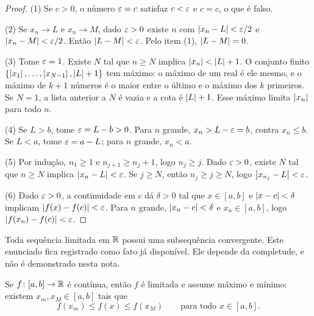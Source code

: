 \documentclass[11pt,a4paper]{article}
\begin{document}
\begin{proof}
(1) Se $c>0$, o n\'umero $\varepsilon=c$ satisfaz $c<\varepsilon$ e $c=c$, o que \'e falso.

(2) Se $x_n\to L$ e $x_n\to M$, dado $\varepsilon>0$ existe $n$ com $\left\lvert x_n-L \right\rvert<\varepsilon/2$ e $\left\lvert x_n-M \right\rvert<\varepsilon/2$. Ent\~ao $\left\lvert L-M \right\rvert<\varepsilon$. Pelo item (1), $\left\lvert L-M \right\rvert=0$.

(3) Tome $\varepsilon=1$. Existe $N$ tal que $n\ge N$ implica $\left\lvert x_n \right\rvert<\left\lvert L \right\rvert+1$. O conjunto finito $\{\left\lvert x_1 \right\rvert,\ldots,\left\lvert x_{N-1} \right\rvert,\left\lvert L \right\rvert+1\}$ tem m\'aximo: o m\'aximo de um real \'e ele mesmo, e o m\'aximo de $k+1$ n\'umeros \'e o maior entre o \'ultimo e o m\'aximo dos $k$ primeiros. Se $N=1$, a lista anterior a $N$ \'e vazia e a cota \'e $\left\lvert L \right\rvert+1$. Esse m\'aximo limita $\left\lvert x_n \right\rvert$ para todo $n$.

(4) Se $L>b$, tome $\varepsilon=L-b>0$. Para $n$ grande, $x_n>L-\varepsilon=b$, contra $x_n\le b$. Se $L<a$, tome $\varepsilon=a-L$; para $n$ grande, $x_n<a$.

(5) Por indu\c{c}\~ao, $n_1\ge 1$ e $n_{j+1}\ge n_j+1$, logo $n_j\ge j$. Dado $\varepsilon>0$, existe $N$ tal que $n\ge N$ implica $\left\lvert x_n-L \right\rvert<\varepsilon$. Se $j\ge N$, ent\~ao $n_j\ge j\ge N$, logo $\left\lvert x_{n_j}-L \right\rvert<\varepsilon$.

(6) Dado $\varepsilon>0$, a continuidade em $c$ d\'a $\delta>0$ tal que $x\in[a,b]$ e $\left\lvert x-c \right\rvert<\delta$ implicam $\left\lvert f(x)-f(c) \right\rvert<\varepsilon$. Para $n$ grande, $\left\lvert x_n-c \right\rvert<\delta$ e $x_n\in[a,b]$, logo $\left\lvert f(x_n)-f(c) \right\rvert<\varepsilon$.
\end{proof}

\begin{teorema}
\label{teo:bw}
Toda sequ\^encia limitada em $\mathbb{R}$ possui uma subsequ\^encia convergente. Este enunciado fica registrado como fato j\'a dispon\'ivel. Ele depende da completude, e n\~ao \'e demonstrado nesta nota.
\end{teorema}

\begin{teorema}[Weierstrass]
\label{teo:weierstrass}
Se $f\colon[a,b]\to\mathbb{R}$ \'e cont\'inua, ent\~ao $f$ \'e limitada e assume m\'aximo e m\'inimo: existem $x_m,x_M\in[a,b]$ tais que
\[
f(x_m)\le f(x)\le f(x_M) \qquad\text{para todo }x\in[a,b].
\]
\end{teorema}
\end{document}
